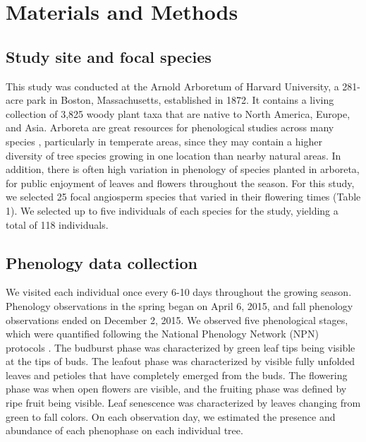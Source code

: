 \documentclass{article}
\begin{document}
\section* {Materials and Methods}
\subsection*{Study site and focal species}
This study was conducted at the Arnold Arboretum of Harvard University, a 281-acre park in Boston, Massachusetts, established in 1872. It contains a living collection of 3,825 woody plant taxa that are native to North America, Europe, and Asia. Arboreta are great resources for phenological studies across many species \citep [e.g., ][]{primack2009a}, particularly in temperate areas, since they may contain a higher diversity of tree species growing in one location than nearby natural areas. In addition, there is often high variation in phenology of species planted in arboreta, for public enjoyment of leaves and flowers throughout the season. For this study, we selected 25 focal angiosperm species that varied in their flowering times (Table 1). We selected up to five individuals of each species for the study, yielding a total of 118 individuals.

\subsection*{Phenology data collection}
We visited each individual once every 6-10 days throughout the growing season. Phenology observations in the spring began on April 6, 2015, and fall phenology observations ended on December 2, 2015. We observed five phenological stages, which were quantified following the National Phenology Network (NPN) protocols \citep[for a full description see][]{denny2014}. The budburst phase was characterized by green leaf tips being visible at the tips of buds. The leafout phase was characterized by visible fully unfolded leaves and petioles that have completely emerged from the buds. %
The flowering phase was when open flowers are visible, and the fruiting phase was defined by ripe fruit being visible. Leaf senescence was characterized by leaves changing from green to fall colors. On each observation day, we estimated the presence and abundance of each phenophase on each individual tree.
\end{document}
